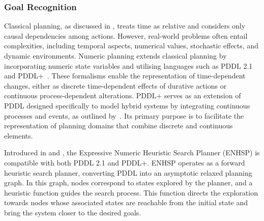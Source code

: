 \subsubsection{Goal Recognition}
Classical planning, as discussed in \citet{Fox2003}, treats time as relative and considers only causal dependencies among actions. However, real-world problems often entail complexities, including temporal aspects, numerical values, stochastic effects, and dynamic environments. Numeric planning extends classical planning by incorporating numeric state variables and utilising languages such as PDDL 2.1~\cite{Fox2003} and PDDL+~\cite{Fox2006}. These formalisms enable the representation of time-dependent changes, either as discrete time-dependent effects of durative actions or continuous process-dependent alterations. PDDL+ serves as an extension of PDDL designed specifically to model hybrid systems by integrating continuous processes and events, as outlined by~\citet{Haslum2019}. Its primary purpose is to facilitate the representation of planning domains that combine discrete and continuous elements.

Introduced in \citet{Scala2016} and \citet{ScalaHaslum2016}, the Expressive Numeric Heuristic Search Planner (ENHSP) is compatible with both PDDL 2.1 and PDDL+. ENHSP operates as a forward heuristic search planner, converting PDDL into an asymptotic relaxed planning graph. In this graph, nodes correspond to states explored by the planner, and a heuristic function guides the search process. This function directs the exploration towards nodes whose associated states are reachable from the initial state and bring the system closer to the desired goals.


